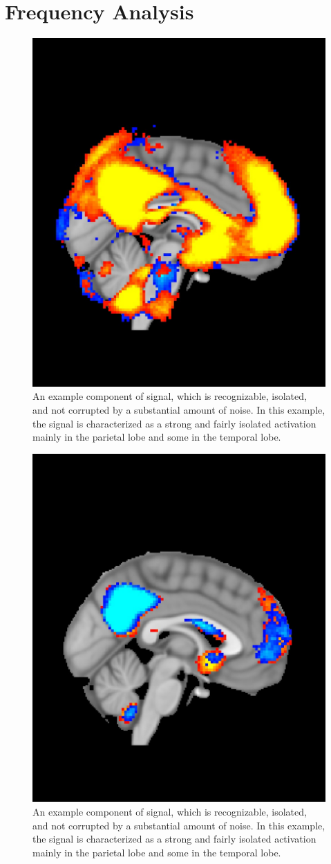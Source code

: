 \section{Frequency Analysis}

\begin{figure}[H]                 
	\includegraphics[width=.65\textwidth]{figures/Results/Neg_10-30}  
	\caption{An example component of signal, which is recognizable, isolated, and not corrupted by a substantial amount of noise. In this example, the signal is characterized as a strong and fairly isolated activation mainly in the parietal lobe and some in the temporal lobe.}
	\label{fig:res:diffpos} 
\end{figure}

\begin{figure}[H]                 
	\includegraphics[width=.65\textwidth]{figures/Results/Neg_40-60}  
	\caption{An example component of signal, which is recognizable, isolated, and not corrupted by a substantial amount of noise. In this example, the signal is characterized as a strong and fairly isolated activation mainly in the parietal lobe and some in the temporal lobe.}
	\label{fig:res:diffneg} 
\end{figure}


